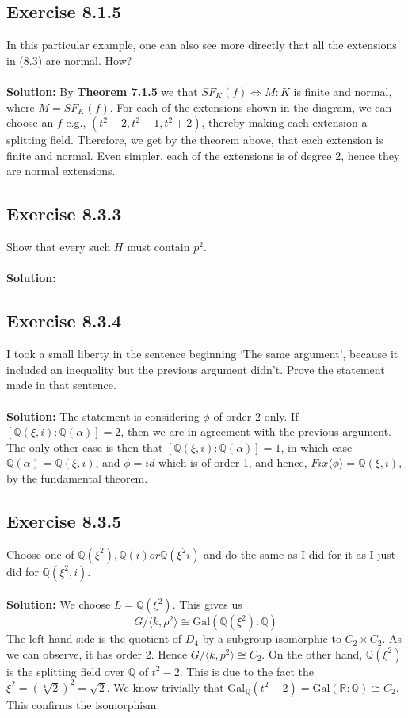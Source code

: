 \documentclass{article}
\begin{document}
\subsection*{Exercise 8.1.5}
In this particular example, one can also see more
directly that all the extensions in (8.3) are normal. How?
\\\\
\textbf{Solution:}
By \textbf{Theorem 7.1.5} we that $SF_K(f) \iff M:K$ is finite and normal, where $M = SF_K(f)$. For each of the extensions shown in the diagram,
we can choose an $f$ e.g., $(t^2-2, t^2+1, t^2+2)$, thereby making each extension a splitting field. Therefore, we get by the theorem above,
that each extension is finite and normal. Even simpler, each of the extensions is of degree 2, hence they are normal extensions.

\subsection*{Exercise 8.3.3}
Show that every such $H$ must contain $p^2$.
\\\\
\textbf{Solution:}

\subsection*{Exercise 8.3.4}
I took a small liberty in the sentence beginning
‘The same argument’, because it included an inequality but the
previous argument didn’t. Prove the statement made in that sentence.
\\\\
\textbf{Solution:}
The statement is considering $\phi$ of order 2 only.
If $[\mathbb{Q}(\xi,i):\mathbb{Q}(\alpha)] = 2$, then we are in agreement with the previous argument.
The only other case is then that $[\mathbb{Q}(\xi,i):\mathbb{Q}(\alpha)] = 1$, in which case $\mathbb{Q}(\alpha) = \mathbb{Q}(\xi, i)$,
and $\phi = id$ which is of order 1, and hence, $Fix\langle \phi \rangle = \mathbb{Q}(\xi, i)$, by the fundamental theorem.

\subsection*{Exercise 8.3.5}
Choose one of $\mathbb{Q}(\xi^2), \mathbb{Q}(i) or \mathbb{Q}(\xi^2i)$ and do the same as I did for it as I just did for $\mathbb{Q}(\xi^2,i)$.
\\\\
\textbf{Solution:}
We choose $L=\mathbb{Q}(\xi^2)$. 
This gives us \[ G / \langle k, \rho^2 \rangle  \cong \text{Gal}(\mathbb{Q}(\xi^2):\mathbb{Q}) \]
The left hand side is the quotient of $D_4$ by a subgroup isomorphic to $C_2 \times C_2$. As we can observe, it has order 2.
Hence $G/ \langle k, p^2 \rangle \cong C_2$. On the other hand, $\mathbb{Q}(\xi^2)$ is the splitting field over $\mathbb{Q}$ of
$t^2 -2$. This is due to the fact the $\xi^2 = (\sqrt[4]{2})^2 = \sqrt2$. We know trivially that $\text{Gal}_{\mathbb{Q}}(t^2-2) = \text{Gal}(\mathbb{R}: \mathbb{Q}) \cong C_2$.
This confirms the isomorphism.
\end{document}
